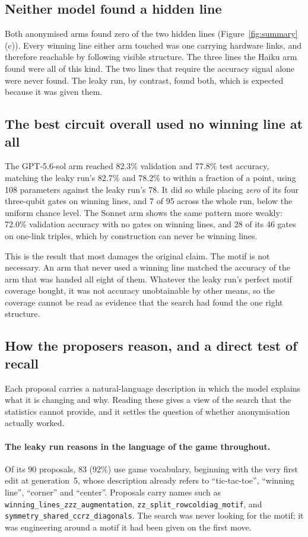 \documentclass[11pt]{article}
\begin{document}
\subsection{Neither model found a hidden line}

Both anonymised arms found zero of the two hidden lines
(Figure~\ref{fig:summary}(c)). Every winning line either arm touched was one
carrying hardware links, and therefore reachable by following visible structure.
The three lines the Haiku arm found were all of this kind. The two lines that
require the accuracy signal alone were never found. The leaky run, by contrast,
found both, which is expected because it was given them.

\subsection{The best circuit overall used no winning line at all}

The GPT-5.6-sol arm reached 82.3\% validation and 77.8\% test accuracy, matching
the leaky run's 82.7\% and 78.2\% to within a fraction of a point, using 108
parameters against the leaky run's 78. It did so while placing \emph{zero} of its
four three-qubit gates on winning lines, and 7 of 95 across the whole run, below
the uniform chance level. The Sonnet arm shows the same pattern more weakly:
72.0\% validation accuracy with no gates on winning lines, and 28 of its 46 gates
on one-link triples, which by construction can never be winning lines.

This is the result that most damages the original claim. The motif is not
necessary. An arm that never used a winning line matched the accuracy of the arm
that was handed all eight of them. Whatever the leaky run's perfect motif coverage
bought, it was not accuracy unobtainable by other means, so the coverage cannot be
read as evidence that the search had found the one right structure.

\subsection{How the proposers reason, and a direct test of recall}
\label{sec:reasoning}

Each proposal carries a natural-language description in which the model explains
what it is changing and why. Reading these gives a view of the search that the
statistics cannot provide, and it settles the question of whether anonymisation
actually worked.

\paragraph{The leaky run reasons in the language of the game throughout.}
Of its 90 proposals, 83 (92\%) use game vocabulary, beginning with the very first
edit at generation~5, whose description already refers to ``tic-tac-toe'',
``winning line'', ``corner'' and ``center''. Proposals carry names such as
\texttt{winning\_lines\_zzz\_augmentation}, \texttt{zz\_split\_rowcoldiag\_motif},
and \texttt{symmetry\_shared\_ccrz\_diagonals}. The search was never looking for
the motif; it was engineering around a motif it had been given on the first move.
\end{document}
